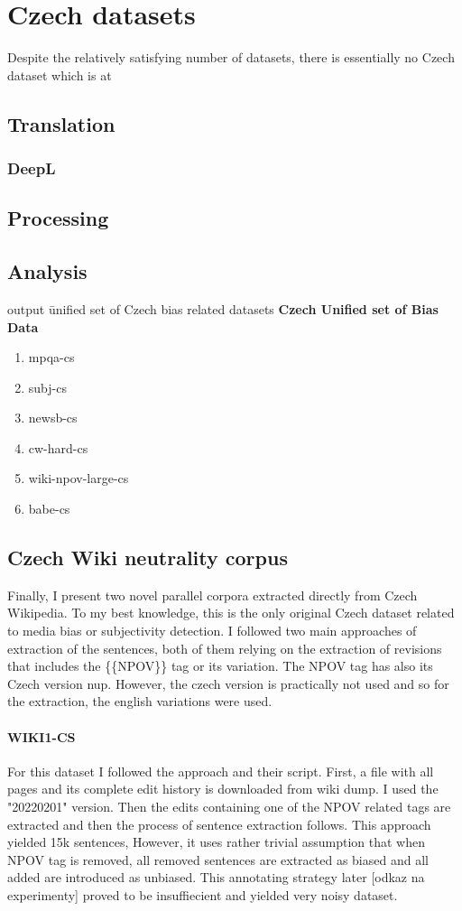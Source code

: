\chapter{Czech datasets}
Despite the relatively satisfying number of datasets, there is essentially no Czech dataset which is at 
\section{Translation}
\subsection{DeepL}
\section{Processing}
\section{Analysis}
output \= unified set of Czech bias related datasets
\textbf{Czech Unified set of Bias Data}
\begin{enumerate}
    \item mpqa-cs
    \item subj-cs
    \item newsb-cs
    \item cw-hard-cs
    \item wiki-npov-large-cs
    \item babe-cs
\end{enumerate}

\newpage

\section{Czech Wiki neutrality corpus}
Finally, I present two novel parallel corpora extracted directly from Czech Wikipedia. To my best knowledge, this is the only original Czech dataset related to media bias or subjectivity detection.
I followed two main approaches of extraction of the sentences, both of them relying on the extraction of revisions that includes the \{\{NPOV\}\} tag or its variation. The NPOV tag has also its Czech version \Gls{nup}. However, the czech version is practically not used and so for the extraction, the english variations were used.

\subsubsection{WIKI1-CS}
For this dataset I followed the \cite{aleksandrova2019multilingual} approach and their script. First, a file with all pages and its complete edit history is downloaded from wiki dump. I used the "20220201" version. Then the edits containing one of the NPOV related tags are extracted and then the process of sentence extraction follows.
This approach yielded 15k sentences, However, it uses rather trivial assumption that when NPOV tag is removed, all removed sentences are extracted as biased and all added are introduced as unbiased. This annotating strategy later [odkaz na experimenty] proved to be insuffiecient and yielded very noisy dataset.

